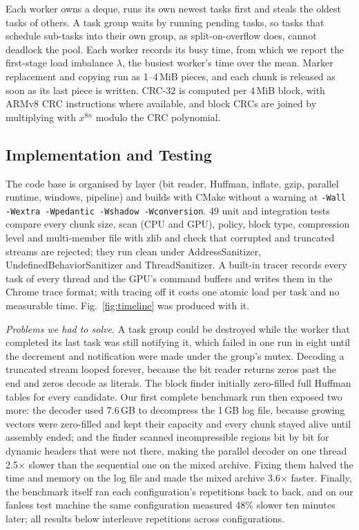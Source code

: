 \documentclass[conference]{IEEEtran}
\begin{document}
Each worker owns a deque, runs its own newest tasks first and steals the oldest
tasks of others. A task group waits by running pending tasks, so tasks that schedule
sub-tasks into their own group, as split-on-overflow does, cannot deadlock the pool.
Each worker records its busy time, from which we report the first-stage load
imbalance $\lambda$, the busiest worker's time over the mean. Marker replacement and
copying run as 1--4\,MiB pieces, and each chunk is released as soon as its last piece
is written. CRC-32 is computed per 4\,MiB block, with ARMv8 CRC instructions where
available, and block CRCs are joined by multiplying with $x^{8n}$ modulo the CRC
polynomial.

\subsection{Implementation and Testing}

The code base is organised by layer (bit reader, Huffman, inflate, gzip, parallel
runtime, windows, pipeline) and builds with CMake without a warning at
\texttt{-Wall -Wextra -Wpedantic -Wshadow -Wconversion}. 49 unit and integration tests compare
every chunk size, scan (CPU and GPU), policy, block type, compression level and multi-member file
with zlib and check that corrupted and truncated streams are rejected; they run
clean under AddressSanitizer, UndefinedBehaviorSanitizer and ThreadSanitizer.
A built-in tracer records every task of every thread and the GPU's command buffers
and writes them in the Chrome trace format; with tracing off it costs one atomic load
per task and no measurable time. Fig.~\ref{fig:timeline} was produced with it.

\emph{Problems we had to solve.} A task group could be destroyed while the worker
that completed its last task was still notifying it, which failed in one run in
eight until the decrement and notification were made under the group's mutex.
Decoding a truncated stream looped forever, because the bit reader returns zeros
past the end and zeros decode as literals. The block finder initially zero-filled
full Huffman tables for every candidate. Our first complete benchmark run then
exposed two more: the decoder used 7.6\,GB to decompress the 1\,GB log file, because
growing vectors were zero-filled and kept their capacity and every chunk stayed
alive until assembly ended; and the finder scanned incompressible regions bit by bit
for dynamic headers that were not there, making the parallel decoder on one thread
2.5$\times$ slower than the sequential one on the mixed archive. Fixing them halved
the time and memory on the log file and made the mixed archive 3.6$\times$ faster.
Finally, the benchmark itself ran each configuration's repetitions back to back, and
on our fanless test machine the same configuration measured 48\% slower ten minutes
later; all results below interleave repetitions across configurations.
\end{document}
